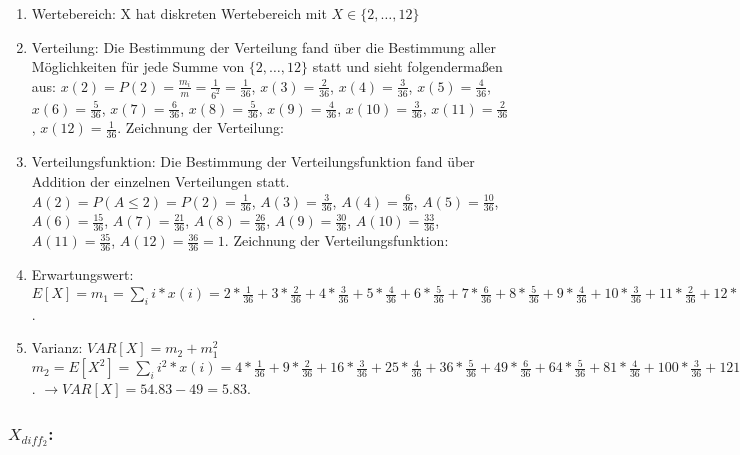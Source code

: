 \documentclass[%
10pt,              %
ngerman,           %
a4paper,           %
DIV11,             %
]{scrartcl}%
\begin{document}
\begin{enumerate}
	\item Wertebereich: X hat diskreten Wertebereich mit $X \in \{2, \dots, 12 \}$
	\item Verteilung: Die Bestimmung der Verteilung fand über die Bestimmung aller Möglichkeiten für jede Summe von $\{2, \dots, 12 \}$ statt und sieht folgendermaßen aus:\newline
	$x(2) = P(2) = \frac{m_i}{m} = \frac{1}{6^2} = \frac{1}{36}$,\newline
	$x(3) = \frac{2}{36}$, $x(4) = \frac{3}{36}$, $x(5) = \frac{4}{36}$, $x(6) = \frac{5}{36}$, $x(7) = \frac{6}{36}$, $x(8) = \frac{5}{36}$, $x(9) = \frac{4}{36}$, $x(10) = \frac{3}{36}$, $x(11) = \frac{2}{36}$, $x(12) = \frac{1}{36}$. Zeichnung der Verteilung: 
	
	\item Verteilungsfunktion: Die Bestimmung der Verteilungsfunktion fand über Addition der einzelnen Verteilungen statt.\newline
	$A(2) = P(A \leq 2) = P(2) = \frac{1}{36}$,\newline
	$A(3) = \frac{3}{36}$, $A(4) = \frac{6}{36}$, $A(5) = \frac{10}{36}$, $A(6) = \frac{15}{36}$, $A(7) = \frac{21}{36}$, $A(8) = \frac{26}{36}$, $A(9) = \frac{30}{36}$, $A(10) = \frac{33}{36}$, $A(11) = \frac{35}{36}$, $A(12) = \frac{36}{36} = 1$. Zeichnung der Verteilungsfunktion: 
	
	\item Erwartungswert: $E[X] = m_1 = \sum_{i} i * x(i) = 2 * \frac{1}{36} + 3 * \frac{2}{36} + 4 * \frac{3}{36} + 5 * \frac{4}{36} + 6 * \frac{5}{36} + 7 * \frac{6}{36} + 8 * \frac{5}{36} + 9 * \frac{4}{36} + 10 * \frac{3}{36} + 11 * \frac{2}{36} + 12 * \frac{1}{36} = 7$.
	\item Varianz: $VAR[X] = m_2 + m_1^2$\newline
	$m_2 = E[X^2] = \sum_{i} i^2 * x(i) = 4 * \frac{1}{36} + 9 * \frac{2}{36} + 16 * \frac{3}{36} + 25 * \frac{4}{36} + 36 * \frac{5}{36} + 49 * \frac{6}{36} + 64 * \frac{5}{36} + 81 * \frac{4}{36} + 100 * \frac{3}{36} + 121 * \frac{2}{36} + 144 * \frac{1}{36} \approx 54.83$.\newline
	$\rightarrow VAR[X] = 54.83 - 49 = 5.83$.
\end{enumerate}

\subsubsection*{$X_{diff_2}$:}
\end{document}
